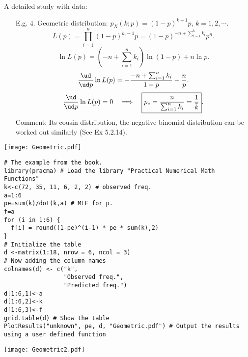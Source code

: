 \begin{frame}
  A detailed study with data: \\[1em]
 \begin{enumerate}
 \item[E.g. 4.] Geometric distribution: $p_X(k;p)=  (1-p)^{k-1} p$, $k=1,2,\cdots$.
 \[
 L(p) = \prod_{i=1}^n (1-p)^{k_i-1} p
 = (1-p)^{-n+ \sum_{i=1}^k k_i }p^n.
 \]\pause
 \[
 \ln L(p) = \left(-n+\sum_{i=1}^n k_i\right) \ln(1-p) + n\ln p.
 \]\pause
 \[
 \frac{\ud }{\ud p} \ln L(p) =  -\frac{-n+\sum_{i=1}^n k_i}{1-p} +\frac{n}{p}.
 \]\pause
 \[
 \frac{\ud }{\ud p} \ln L(p) =0 \quad\Longrightarrow\quad
 \boxed{p_e= \frac{n}{\sum_{i=1}^n k_i} = \frac{1}{\bar{k} }}.
 \]\pause
\vfill
Comment: Its cousin distribution, the negative binomial distribution can be worked out similarly (See Ex 5.2.14).
 \end{enumerate}
\end{frame}
\begin{frame}
	\begin{center}
		\texttt{[image: Geometric.pdf]}
	\end{center}
\end{frame}
\begin{frame}[fragile]

 \begin{lstlisting}
# The example from the book.
library(pracma) # Load the library "Practical Numerical Math Functions"
k<-c(72, 35, 11, 6, 2, 2) # observed freq.
a=1:6
pe=sum(k)/dot(k,a) # MLE for p.
f=a
for (i in 1:6) {
  f[i] = round((1-pe)^(i-1) * pe * sum(k),2)
}
# Initialize the table
d <-matrix(1:18, nrow = 6, ncol = 3)
# Now adding the column names
colnames(d) <- c("k",
                 "Observed freq.",
                 "Predicted freq.")
d[1:6,1]<-a
d[1:6,2]<-k
d[1:6,3]<-f
grid.table(d) # Show the table
PlotResults("unknown", pe, d, "Geometric.pdf") # Output the results using a user defined function
\end{lstlisting}
\end{frame}
\begin{frame}
	\begin{center}
		\texttt{[image: Geometric2.pdf]}
	\end{center}
\end{frame}
